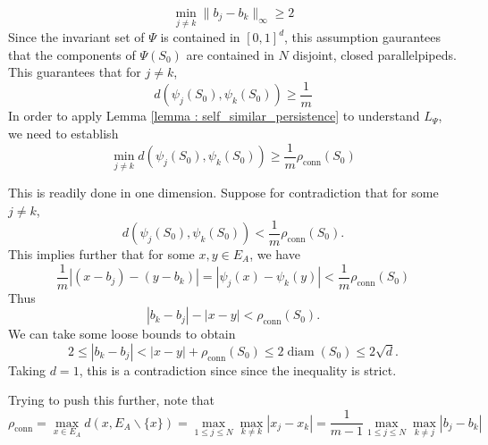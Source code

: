 \documentclass [52pt] {article}
\DeclareMathOperator{\diam}{diam}
\begin{document}
\begin{equation}\label{eq : b_j_spacing}
\min_{j\not= k} \|b_j-b_k\|_\infty \ge 2
\end{equation}
Since the invariant set of $\Psi$ is contained in $[0,1]^d$, this assumption gaurantees that the components of $\Psi(S_0)$ are contained in $N$ disjoint, closed parallelpipeds.  This guarantees that for $j\not= k$, 
\[d(\psi_j(S_0), \psi_k(S_0)) \ge \frac{1}{m}\]
In order to apply Lemma \ref{lemma : self_similar_persistence} to understand $L_\Psi$, we need to establish
\begin{equation}
\min_{j\not= k}d(\psi_j(S_0), \psi_k(S_0)) \ge \frac{1}{m}\rho_{\mathrm{conn}}(S_0)
\end{equation}

This is readily done in one dimension.  Suppose for contradiction that for some $j\not= k$, 
\[d(\psi_j(S_0),\psi_k(S_0))<\frac{1}{m}\rho_{\mathrm{conn}}(S_0).\]
This implies further that for some $x,y\in E_A$, we have 
\[\frac{1}{m}|(x - b_j) - (y-b_k)| = |\psi_j(x)-\psi_k(y)| < \frac{1}{m}\rho_{\mathrm{conn}}(S_0)\]
Thus
\[|b_k-b_j|-|x-y| <\rho_{\mathrm{conn}}(S_0).\]
We can take some loose bounds to obtain
\[2\le|b_k-b_j| <|x-y| + \rho_{\mathrm{conn}}(S_0)\le 2\diam(S_0) \le 2\sqrt{d}.\]
Taking $d = 1$, this is a contradiction since since the inequality is strict.

Trying to push this further, note that 
\[\rho_{\mathrm{conn}} = \max_{x\in E_A}d(x,E_A\backslash\{x\}) = \max_{1\le j\le N}\max_{k\not = k}|x_j-x_k| =\frac{1}{m-1}\max_{1\le j\le N}\max_{k\not= j}|b_j-b_k|\]
\end{document}
